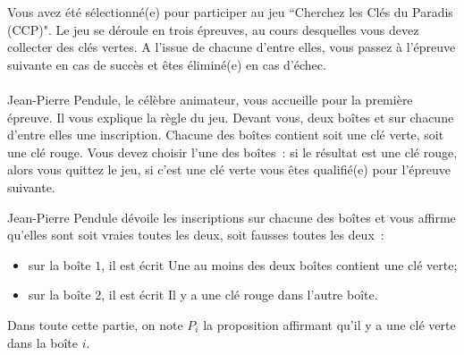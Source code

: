 \documentclass[11pt,a4paper]{article}
\begin{document}
\begin{Exercise}[title = {Logique et calcul des propositions}, origin = {\bac \; {\sc ccinp 2018 - mp}}]
	Vous avez été sélectionné(e) pour participer au jeu ``Cherchez les Clés du Paradis (CCP)".
	Le jeu se déroule en trois épreuves, au cours desquelles vous devez collecter des clés vertes.
	A l'issue de chacune d'entre elles, vous passez à l'épreuve suivante en cas de succès et êtes éliminé(e) en cas d'échec.\\

	\ExePart[name = {Première épreuve}]\\
	Jean-Pierre Pendule, le célèbre animateur, vous accueille pour la première épreuve.
	Il vous explique la règle du jeu.
	Devant vous, deux boîtes et sur chacune d'entre elles une inscription.
	Chacune des boîtes contient soit une clé verte, soit une clé rouge.
	Vous devez choisir l'une des boîtes~: si le résultat est une clé rouge, alors vous quittez le jeu, si c'est une clé verte vous êtes qualifié(e) pour l'épreuve suivante.

	Jean-Pierre Pendule dévoile les inscriptions sur chacune des boîtes et vous affirme qu'elles sont soit vraies toutes les deux, soit fausses toutes les deux~:
	\begin{itemize}
		\item sur la boîte $1$, il est écrit \og{}Une au moins des deux boîtes contient une clé verte\fg{};
		\item  sur la boîte $2$, il est écrit \og{}Il y a une clé rouge dans l'autre boîte\fg{}.
	\end{itemize}
	Dans toute cette partie, on note $P_i$ la proposition affirmant qu'il y a une clé verte dans la boîte $i$.
	\\



\end{Exercise}
\end{document}
